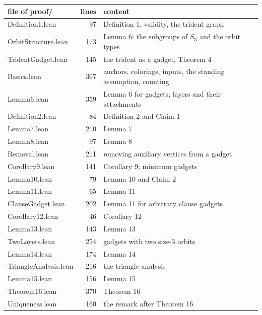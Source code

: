 \documentclass[11pt,a4paper]{article}
\newcommand{\leanus}{\textunderscore\allowbreak}
\newcommand{\lean}[1]{{\ttfamily\let\_\leanus #1}}
\begin{document}
\begin{center}
\begin{tabular}{@{}lrl@{}}
\toprule
file of \lean{proof/} & lines & content\\
\midrule
\lean{Definition1.lean} & 97 & Definition 1, validity, the trident graph\\
\lean{OrbitStructure.lean} & 173 & Lemma 6: the subgroups of $S_3$ and the orbit types\\
\lean{TridentGadget.lean} & 145 & the trident as a gadget, Theorem 4\\
\lean{Basics.lean} & 367 & anchors, colorings, inputs, the standing assumption, counting\\
\lean{Lemma6.lean} & 359 & Lemma 6 for gadgets; layers and their attachments\\
\lean{Definition2.lean} & 84 & Definition 2 and Claim 1\\
\lean{Lemma7.lean} & 210 & Lemma 7\\
\lean{Lemma8.lean} & 97 & Lemma 8\\
\lean{Removal.lean} & 211 & removing auxiliary vertices from a gadget\\
\lean{Corollary9.lean} & 141 & Corollary 9; minimum gadgets\\
\lean{Lemma10.lean} & 79 & Lemma 10 and Claim 2\\
\lean{Lemma11.lean} & 65 & Lemma 11\\
\lean{ClauseGadget.lean} & 202 & Lemma 11 for arbitrary clause gadgets\\
\lean{Corollary12.lean} & 46 & Corollary 12\\
\lean{Lemma13.lean} & 143 & Lemma 13\\
\lean{TwoLayers.lean} & 254 & gadgets with two size-3 orbits\\
\lean{Lemma14.lean} & 174 & Lemma 14\\
\lean{TriangleAnalysis.lean} & 216 & the triangle analysis\\
\lean{Lemma15.lean} & 156 & Lemma 15\\
\lean{Theorem16.lean} & 370 & Theorem 16\\
\lean{Uniqueness.lean} & 160 & the remark after Theorem 16\\
\bottomrule
\end{tabular}
\end{center}
\end{document}
